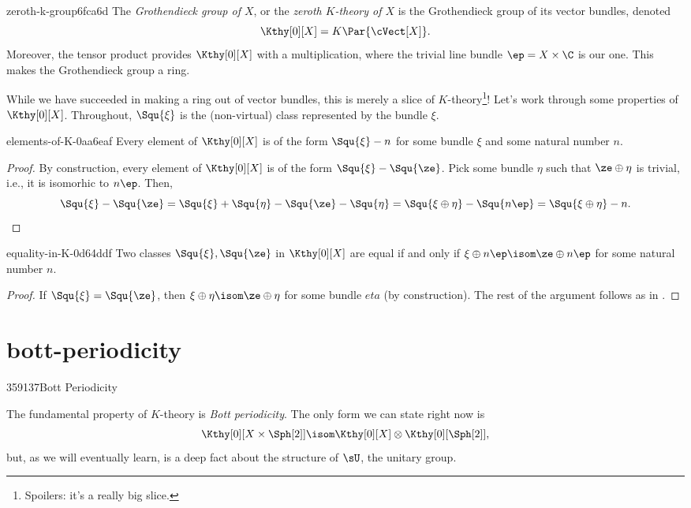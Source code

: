 \begin{defn}{zeroth-k-group}{6fca6d}
  The \emph{Grothendieck group of $X$}, or the \emph{zeroth $K$-theory of $X$} is the
  Grothendieck group of its vector bundles, denoted 
  \[ \Kthy[0][X] = K\Par{\cVect[X]}. \] 
  Moreover, the tensor product provides $\Kthy[0][X]$ with a multiplication, where the
  trivial line bundle $\ep = X \times \C$ is our one. This makes the Grothendieck group a ring.
\end{defn}

While we have succeeded in making a ring out of vector bundles, this is merely a 
slice of $K$-theory\footnote{Spoilers: it's a really big slice.}! Let's work through some
properties of $\Kthy[0][X]$. Throughout, $\Squ{\xi}$ is the (non-virtual) class represented
by the bundle $\xi$.

\begin{prop}{elements-of-K-0}{aa6eaf}
  Every element of $\Kthy[0][X]$ is of the form $\Squ{\xi} - n$ for some bundle $\xi$ and
  some natural number $n$.
\end{prop}
\begin{proof}
  By construction, 
  every element of $\Kthy[0][X]$ is of the form $\Squ{\xi} - \Squ{\ze}$. Pick some 
  bundle $\eta$ such that $\ze \oplus \eta$ is trivial, i.e., it is isomorhic to $n\ep$. 
  Then,
  \[ \Squ{\xi} - \Squ{\ze} = \Squ{\xi} + \Squ{\eta} - \Squ{\ze} - \Squ{\eta} = 
      \Squ{\xi \oplus \eta} - \Squ{n\ep} = \Squ{\xi \oplus \eta} - n. \] 
\end{proof}

\begin{prop}{equality-in-K-0}{d64ddf}
  Two classes $\Squ{\xi}, \Squ{\ze}$ in $\Kthy[0][X]$ are equal if and only if
  $\xi \oplus n\ep \isom \ze \oplus n\ep$ for some natural number $n$.
\end{prop}
\begin{proof}
  If $\Squ{\xi} = \Squ{\ze}$, then $\xi \oplus \eta \isom \ze \oplus \eta$ for some bundle
  $eta$ (by construction). The rest of the argument follows as in .
\end{proof}

\section{bott-periodicity}{359137}{Bott Periodicity}

The fundamental property of $K$-theory is \emph{Bott periodicity}. The only form we can
state right now is
\[ \Kthy[0][X \times {\Sph[2]}] \isom \Kthy[0][X] \otimes \Kthy[0][{\Sph[2]}], \]
but, as we will eventually learn, is a deep fact about the structure of $\sU$, the unitary
group.

